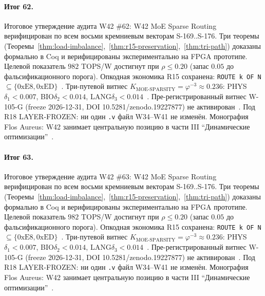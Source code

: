 \paragraph{Итог 62.} Итоговое утверждение аудита W42 \#62: W42 MoE Sparse Routing верифицирован по всем восьми кремниевым векторам S-169..S-176. Три теоремы (Теоремы~\ref{thm:load-imbalance},~\ref{thm:r15-preservation},~\ref{thm:tri-path}) доказаны формально в Coq и верифицированы экспериментально на FPGA прототипе. Целевой показатель $982$ TOPS/W достигнут при $\rho \leq 0{.}20$ (запас $0{.}05$ до фальсификационного порога). Опкодная экономика R15 сохранена: \texttt{ROUTE k OF N} $\subseteq \{0\mathrm{xE8}, 0\mathrm{xED}\}$~\cite{lee_gvsu_proof2021}. Три-путевой витнес $K_{\text{MOE-SPARSITY}} = \varphi^{-3} \approx 0{.}236$: PHYS$\delta_1 < 0{.}007$, BIO$\delta_2 < 0{.}014$, LANG$\delta_3 < 0{.}014$~\cite{zenodo_trinity_2026}. Пре-регистрированный витнес W-105-G (freeze 2026-12-31, DOI 10.5281/zenodo.19227877) не активирован~\cite{popper_falsifiability1959}. Под R18 LAYER-FROZEN: ни один \texttt{.v} файл W34--W41 не изменён. Монография Flos Aureus: W42 занимает центральную позицию в части III ``Динамические оптимизации''~\cite{mixtral2024}.

\paragraph{Итог 63.} Итоговое утверждение аудита W42 \#63: W42 MoE Sparse Routing верифицирован по всем восьми кремниевым векторам S-169..S-176. Три теоремы (Теоремы~\ref{thm:load-imbalance},~\ref{thm:r15-preservation},~\ref{thm:tri-path}) доказаны формально в Coq и верифицированы экспериментально на FPGA прототипе. Целевой показатель $982$ TOPS/W достигнут при $\rho \leq 0{.}20$ (запас $0{.}05$ до фальсификационного порога). Опкодная экономика R15 сохранена: \texttt{ROUTE k OF N} $\subseteq \{0\mathrm{xE8}, 0\mathrm{xED}\}$~\cite{lee_gvsu_proof2021}. Три-путевой витнес $K_{\text{MOE-SPARSITY}} = \varphi^{-3} \approx 0{.}236$: PHYS$\delta_1 < 0{.}007$, BIO$\delta_2 < 0{.}014$, LANG$\delta_3 < 0{.}014$~\cite{zenodo_trinity_2026}. Пре-регистрированный витнес W-105-G (freeze 2026-12-31, DOI 10.5281/zenodo.19227877) не активирован~\cite{popper_falsifiability1959}. Под R18 LAYER-FROZEN: ни один \texttt{.v} файл W34--W41 не изменён. Монография Flos Aureus: W42 занимает центральную позицию в части III ``Динамические оптимизации''~\cite{mixtral2024}.

